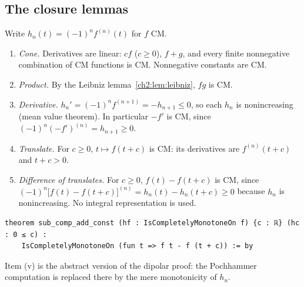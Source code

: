 \subsection{The closure lemmas}
Write $h_n(t)=(-1)^nf^{(n)}(t)$ for $f$ CM.
\begin{enumerate}[label=(\roman*),itemsep=2pt]
\item \emph{Cone.} Derivatives are linear: $cf$ ($c\ge0$), $f+g$, and every finite nonnegative combination of
CM functions is CM. Nonnegative constants are CM.
\item \emph{Product.} By the Leibniz lemma~\ref{ch2:lem:leibniz}, $fg$ is CM.
\item \emph{Derivative.} $h_n'=(-1)^nf^{(n+1)}=-h_{n+1}\le0$, so each $h_n$ is nonincreasing (mean value theorem). In
particular $-f'$ is CM, since $(-1)^n(-f')^{(n)}=h_{n+1}\ge0$.
\item \emph{Translate.} For $c\ge0$, $t\mapsto f(t+c)$ is CM: its derivatives are $f^{(n)}(t+c)$ and $t+c>0$.
\item \emph{Difference of translates.} For $c\ge0$, $f(t)-f(t+c)$ is CM, since
$(-1)^n\bigl[f(t)-f(t+c)\bigr]^{(n)}=h_n(t)-h_n(t+c)\ge0$ because $h_n$ is nonincreasing. No integral representation is used.
\end{enumerate}
\begin{leanbox}
\begin{lstlisting}[style=chdeux]
theorem sub_comp_add_const (hf : IsCompletelyMonotoneOn f) {c : ℝ} (hc : 0 ≤ c) :
    IsCompletelyMonotoneOn (fun t => f t - f (t + c)) := by
\end{lstlisting}
\end{leanbox}
\noindent Item (v) is the abstract version of the dipolar proof: the Pochhammer computation is replaced there by the
mere monotonicity of $h_n$.

